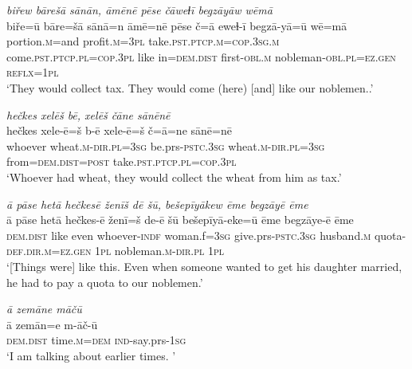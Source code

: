 \ea \label{BP.12}
\textit{biřew bārešā sānān, āmēnē pēse čāweɫī begzāyāw wēmā} \\ 
\gll biře=ū bāre=šā sānā=n āmē=nē pēse č=ā eweɫ-ī begzā-yā=ū wē=mā \\ 
 portion\textsc{.m}=and profit\textsc{.m}\textsc{=3pl} take\textsc{.pst}\textsc{.ptcp}\textsc{.m}\textsc{=cop}\textsc{.3sg}\textsc{.m} come\textsc{.pst}\textsc{.ptcp}\textsc{.pl}\textsc{=cop}\textsc{.3pl} like in=\textsc{dem.dist} first\textsc{-obl}\textsc{.m} nobleman\textsc{-obl}\textsc{.pl}\textsc{=ez.gen} \textsc{reflx}\textsc{=\textsc{1pl}} \\ 
\glt `They would collect tax. They would come (here) [and] like our noblemen..'
\z 
 
\ea \label{BP.15}
\textit{hečkes xelēš bē, xelēš čāne sānēnē} \\ 
\gll hečkes xele-ē=š b-ē xele-ē=š č=ā=ne sānē=nē \\ 
 whoever wheat\textsc{.m}\textsc{-dir}\textsc{.pl}\textsc{=3sg} be.prs\textsc{-pstc}\textsc{.3sg} wheat\textsc{.m}\textsc{-dir}\textsc{.pl}\textsc{=3sg} from=\textsc{dem.dist}\textsc{=\textsc{post}} take\textsc{.pst}\textsc{.ptcp}\textsc{.pl}\textsc{=cop}\textsc{.3pl} \\ 
\glt `Whoever had wheat, they would collect the wheat from him as tax.'
\z 
 
\ea \label{BP.17}
\textit{ā pāse hetā hečkesē ženīš dē šū, bešepīyākew ēme begzāyē ēme} \\ 
\gll ā pāse hetā hečkes-ē ženī=š de-ē šū bešepīyā-eke=ū ēme begzāye-ē ēme \\ 
 \textsc{dem.dist} like even whoever\textsc{-indf} woman.f\textsc{=3sg} give.prs\textsc{-pstc}\textsc{.3sg} husband\textsc{.m} quota\textsc{-def}\textsc{.dir}\textsc{.m}\textsc{=ez.gen} \textsc{1pl} nobleman\textsc{.m}\textsc{-dir}\textsc{.pl} \textsc{1pl} \\ 
\glt `[Things were] like this. Even when someone wanted to get his daughter married, he had to pay a quota  to our noblemen.'
\z 
 
\ea \label{BP.19}
\textit{ā zemāne māčū} \\ 
\gll ā zemān=e m-āč-ū \\ 
 \textsc{dem.dist} time\textsc{.m}\textsc{=dem} \textsc{ind-}say.prs\textsc{-\textsc{1sg}} \\ 
\glt `I am talking about earlier times. '
\z 
 
